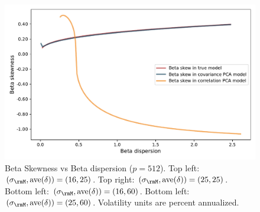 \documentclass[leqno,12pt]{article}
\begin{document}
{\begin{figure}[htp]
\begin{center}
  \includegraphics[scale=0.33]{img/DispersionvsSkew1factorsN512T256fvol25minsvol30maxsvol90}
\end{center}
\caption{Beta Skewness vs Beta dispersion
($p = 512$). 
Top left: $(\sigma_\rmM, \text{ave}(\delta)) = (16,25)$.
Top right: $(\sigma_\rmM, \text{ave}(\delta)) = (25,25)$.
Bottom left: $(\sigma_\rmM, \text{ave}(\delta)) = (16,60)$.
Bottom left: $(\sigma_\rmM, \text{ave}(\delta)) = (25,60)$.
Volatility units are percent annualized.}
\end{figure}


}
\end{document}
